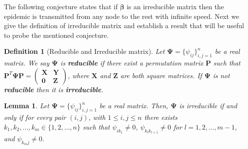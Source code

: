 \documentclass[a4paper,10pt]{article}
\newtheorem{lem}[thm]{Lemma}
\newtheorem{defn}[thm]{Definition}
\newtheorem{prop}[thm]{Proposition}
\theoremstyle{remark}
\newcommand{\bm}[1]{\boldsymbol{#1}}
\begin{document}



The following conjecture states that if $\bm{\beta}$ is an irreducible matrix then the epidemic is transmitted from any node to the rest with infinite speed.
Next we give the definition of irreducible matrix and establish a result that will be useful to probe the mentioned conjecture. 

\begin{defn}[Reducible and Irreducible matrix]
Let $\bm{\Psi}=\{\psi_{ij}\}_{i,j=1}^n$ be a real matrix. We say $\bm{\Psi}$ is \textbf{reducible} if there exist a permutation matrix $\bm{P}$ such that $\bm{P}^{T}\bm{\Psi}\bm{P}=\left(\begin{array}{cc}
     \bm{X}  & \bm{Y}\\
     \bm{0} &  \bm{Z}
\end{array}\right)$, where $\bm{X}$ and $\bm{Z}$ are both square matrices. If $\bm{\Psi}$ is not \textbf{reducible} then it is \textbf{irreducible}.
\end{defn}

\begin{lem}\label{lema:Psi.irredusible<-->Grafofuert.conectado}
Let $\bm{\Psi}=\{\psi_{ij}\}_{i,j=1}^n$ be a real matrix. Then, $\bm{\Psi}$ is irreducible if and only if for every pair $(i,j)$, with $1\leq i,j\leq n$ there exists $k_1,k_2,\ldots,k_m\in \{1,2,\ldots,n\}$ such that $\psi_{ik_1}\neq 0$, $\psi_{k_lk_{l+1}}\neq 0$ for $l=1,2,\ldots,m-1$, and $\psi_{k_mj}\neq 0$.
\end{lem}
\end{document}
